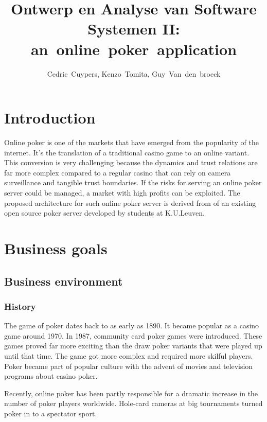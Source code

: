 \documentclass[a4paper,11pt]{report}
\author{Cedric~Cuypers, Kenzo~Tomita, Guy~Van~den~broeck}
\title{Ontwerp en Analyse van Software Systemen II: an~online~poker~application}
\begin{document}
 
\maketitle 
\tableofcontents 
\chapter{Introduction}

Online poker is one of the markets that have emerged from the popularity of the internet. It's the translation of a traditional casino game to an online variant. This conversion is very challenging because the dynamics and trust relations are far more complex compared to a regular casino that can rely on camera surveillance and tangible trust boundaries. If the risks for serving an online poker server could be managed, a market with high profits can be exploited. The proposed architecture for such online poker server is derived from of an existing open source poker server developed by students at K.U.Leuven. 

\chapter{Business goals}

\section{Business environment}
\subsection{History}
The game of poker dates back to as early as 1890. It became popular as a casino game around 1970. In 1987, community card poker games were introduced. These games proved far more exciting than the draw poker variants that were played up until that time. The game got more complex and required more skilful players. Poker became part of popular culture with the advent of movies and television programs about casino poker.

Recently, online poker has been partly responsible for a dramatic increase in the number of poker players worldwide. Hole-card cameras at big tournaments turned poker in to a spectator sport.
\end{document}
